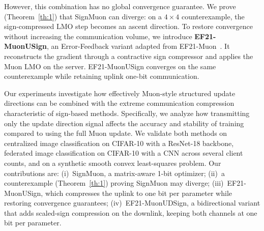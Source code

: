\documentclass[letterpaper]{article} %
\begin{document}
However, this combination has no global convergence guarantee. We prove (Theorem~\ref{th:1}) that SignMuon can diverge: on a $4\times4$ counterexample, the sign-compressed LMO step becomes an ascent direction. To restore convergence without increasing the communication volume, we introduce \textbf{EF21-MuonUSign}, an Error-Feedback variant adapted from EF21-Muon~\citet{gruntkowska2025error}. It reconstructs the gradient through a contractive sign compressor and applies the Muon LMO on the server. EF21-MuonUSign converges on the same counterexample while retaining uplink one-bit communication.

Our experiments investigate how effectively Muon-style structured update directions can be combined with the extreme communication compression characteristic of sign-based methods. Specifically, we analyze how transmitting only the update direction signal affects the accuracy and stability of training compared to using the full Muon update. We validate both methods on centralized image classification on CIFAR-10 with a ResNet-18 backbone, federated image classification on CIFAR-10 with a CNN across several client counts, and on a synthetic smooth convex least-squares problem. Our contributions are:
(i)~SignMuon, a matrix-aware 1-bit optimizer; 
(ii)~a counterexample (Theorem~\ref{th:1}) proving SignMuon may diverge;
(iii)~EF21-MuonUSign, which compresses the uplink to one bit per parameter while restoring convergence guarantees;
(iv)~EF21-MuonUDSign, a bidirectional variant that adds scaled-sign compression on the downlink, keeping both channels at one bit per parameter.
\end{document}
